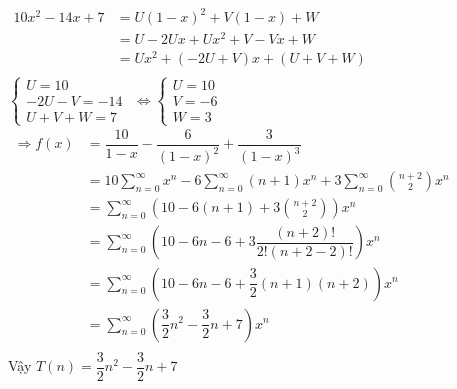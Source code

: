 \documentclass[12pt, letterpaper]{article}
\begin{document}
\begin{enumerate}
	       \\
	      $\begin{aligned}
			      10x^2-14x+7 & = U(1-x)^2 + V(1-x) + W       \\
			                  & = U - 2Ux + Ux^2 + V - Vx + W \\
			                  & = Ux^2 + (-2U+V)x + (U+V+W)   \\
		      \end{aligned}$\\
	      $\begin{cases}
			      U = 10        \\
			      -2U - V = -14 \\
			      U + V + W = 7
		      \end{cases}$
	      $\Leftrightarrow \begin{cases}
			      U = 10 \\
			      V = -6 \\
			      W = 3
		      \end{cases}$\\

	      $\begin{aligned}
			      \Rightarrow f(x) & = \dfrac{10}{1-x} - \dfrac{6}{(1-x)^2} + \dfrac{3}{(1-x)^3}                                        \\
			                       & = 10\sum_{n=0}^{\infty}x^n - 6\sum_{n=0}^{\infty}(n+1)x^n + 3\sum_{n=0}^{\infty}\binom{n+2}{2} x^n \\
			                       & = \sum_{n=0}^{\infty}(10-6(n+1)+3\binom{n+2}{2})x^n                                                \\
			                       & = \sum_{n=0}^{\infty}(10-6n-6+3\dfrac{(n+2)!}{2!(n+2-2)!})x^n                                      \\
			                       & = \sum_{n=0}^{\infty}(10-6n-6+\dfrac{3}{2}(n+1)(n+2))x^n                                           \\
			                       & = \sum_{n=0}^{\infty}(\dfrac{3}{2}n^2 - \dfrac{3}{2}n + 7)x^n                                      \\
		      \end{aligned}$\\
	      Vậy $T(n)=\dfrac{3}{2}n^2 - \dfrac{3}{2}n + 7$\\


\end{enumerate}
\end{document}
